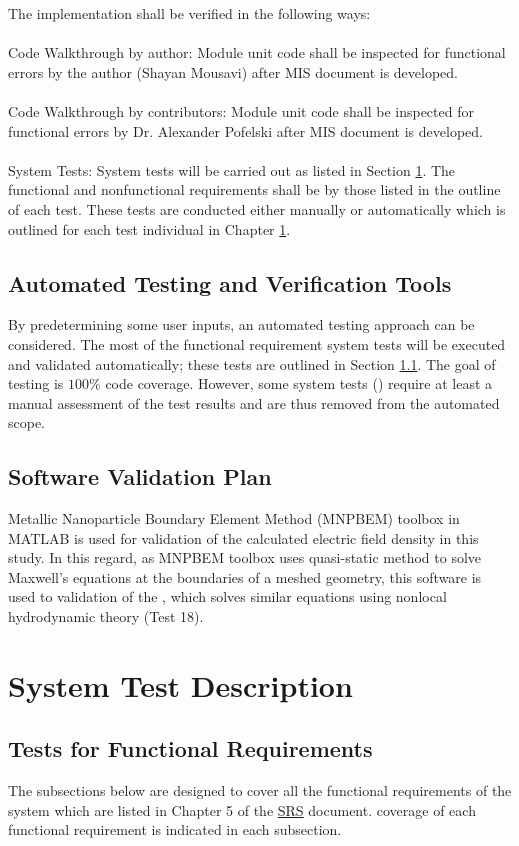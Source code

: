 \documentclass[12pt, titlepage]{article}
\begin{document}
The implementation shall be verified in the following ways:\\
\\
Code Walkthrough by author:  Module unit code shall be inspected for functional errors by the author (Shayan Mousavi) after MIS document is developed.\\  
\\
Code Walkthrough by contributors: Module unit code shall be inspected for functional errors by Dr. Alexander Pofelski after MIS document is developed.\\
\\
System Tests:  System tests will be carried out as listed in Section \ref{systest}. The functional and nonfunctional requirements shall be by those listed in the outline of each test. These tests are conducted either manually or automatically which is outlined for each test individual in Chapter \ref{systest}. 

\subsection{Automated Testing and Verification Tools}

By predetermining some user inputs, an automated testing approach can be
considered. The most of the functional requirement system tests will be executed and
validated automatically; these tests are outlined in Section \ref{func}. The goal of testing is $100\%$ code coverage. However, some system tests () require at least a manual assessment of the test results and
are thus removed from the automated scope.
\subsection{Software Validation Plan}
 
Metallic Nanoparticle Boundary Element Method (MNPBEM) toolbox in MATLAB is used for validation of the calculated electric field density in this study. In this regard, as MNPBEM toolbox uses quasi-static method to solve Maxwell's equations at the boundaries of a meshed geometry, this software is used to validation of the \progname{}, which solves similar equations using nonlocal hydrodynamic theory (Test 18).

\section{System Test Description}
\label{systest}

\subsection{Tests for Functional Requirements}
\label{func}
The subsections below are designed to cover all the functional requirements of the system which are listed in Chapter 5 of the \href{https://github.com/shmouses/SPDFM/tree/master/docs/SRS}{SRS} document. coverage of each functional requirement is indicated in each subsection.
\end{document}
